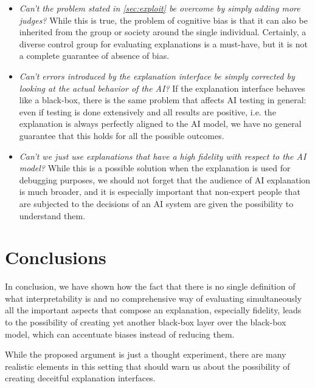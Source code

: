 \documentclass[conference]{IEEEtran}
\begin{document}
\begin{itemize}
    \item \textit{Can't the problem stated in \ref{sec:exploit} be overcome by
              simply adding more judges?} While this is true, the problem of cognitive
          bias is that it can also be inherited from the group or society around the
          single individual. Certainly, a diverse control group for evaluating
          explanations is a must-have, but it is not a complete guarantee of absence
          of bias.
    \item \textit{Can't errors introduced by the explanation interface be simply
              corrected by looking at the actual behavior of the AI?} If the explanation
          interface behaves like a black-box, there is the same problem that affects
          AI testing in general: even if testing is done extensively and all results
          are positive, i.e. the explanation is always perfectly aligned to the AI
          model, we have no general guarantee that this holds for all the possible
          outcomes.
    \item \textit{Can't we just use explanations that have a high fidelity with
              respect to the AI model?} While this is a possible solution when the
          explanation is used for debugging purposes, we should not forget that the
          audience of AI explanation is much broader, and it is especially important
          that non-expert people that are subjected to the decisions of an AI system
          are given the possibility to understand them.
\end{itemize}

\section{Conclusions}
\label{sec:conclusions}

In conclusion, we have shown how the fact that there is no single definition of
what interpretability is and no comprehensive way of evaluating simultaneously
all the important aspects that compose an explanation, especially fidelity,
leads to the possibility of creating yet another black-box layer over the
black-box model, which can accentuate biases instead of reducing them.

While the proposed argument is just a thought experiment, there are many
realistic elements in this setting that should warn us about the possibility of
creating deceitful explanation interfaces.

\printbibliography

% 
% 
\end{document}
